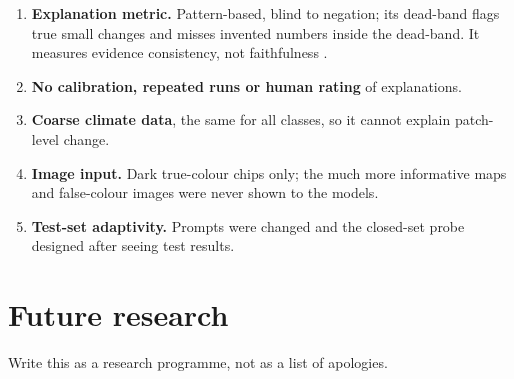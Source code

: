 \begin{enumerate}
  \item \textbf{Explanation metric.} Pattern-based, blind to negation; its dead-band flags true small changes and misses invented numbers inside the dead-band. It measures evidence consistency, not faithfulness \citep{jacovi2020}.
  \item \textbf{No calibration, repeated runs or human rating} of explanations.
  \item \textbf{Coarse climate data}, the same for all classes, so it cannot explain patch-level change.
  \item \textbf{Image input.} Dark true-colour chips only; the much more informative \dndvi{} maps and false-colour images were never shown to the models.
  \item \textbf{Test-set adaptivity.} Prompts were changed and the closed-set probe designed after seeing test results.
\end{enumerate}

\section{Future research}
\label{sec:future}

Write this as a research programme, not as a list of apologies.

